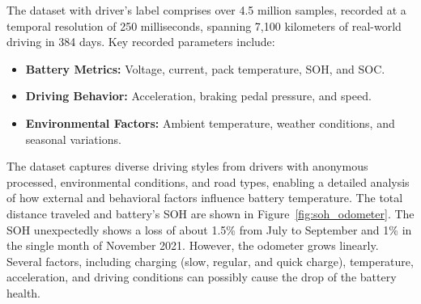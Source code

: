 The dataset with driver's label comprises over 4.5 million samples, recorded at a temporal resolution of 250 milliseconds, spanning 7,100 kilometers of real-world driving in 384 days. 
Key recorded parameters include:

\begin{itemize}
    \item \textbf{Battery Metrics:} Voltage, current, pack temperature, \gls{SOH}, and \gls{SOC}.
    \item \textbf{Driving Behavior:} Acceleration, braking pedal pressure, and speed.
    \item \textbf{Environmental Factors:} Ambient temperature, weather conditions, and seasonal variations.
\end{itemize}

The dataset captures diverse driving styles from drivers with anonymous processed, environmental conditions, and road types, enabling a detailed analysis of how external and behavioral factors influence battery temperature.
The total distance traveled and battery's \gls{SOH} are shown in Figure~\ref{fig:soh_odometer}. 
The \gls{SOH} unexpectedly shows a loss of about 1.5\% from July to September and 1\% in the single month of November 2021. 
However, the odometer grows linearly. 
Several factors, including charging (slow, regular, and quick charge), temperature, acceleration, and driving conditions can possibly cause the drop of the battery health. 

